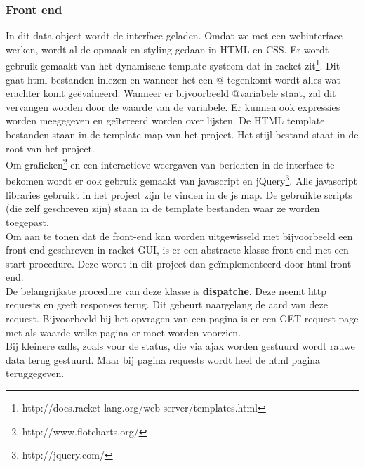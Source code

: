 \documentclass{article}
\begin{document}

\subsubsection{Front end}
\label{ssub:front-end}
In dit data object wordt de interface geladen. Omdat we met een webinterface werken, wordt al de opmaak en styling gedaan in HTML en CSS. Er wordt gebruik gemaakt van het dynamische template systeem dat in racket zit\footnote{http://docs.racket-lang.org/web-server/templates.html}. Dit gaat html bestanden inlezen en wanneer het een @ tegenkomt wordt alles wat erachter komt ge\"evalueerd. Wanneer er bijvoorbeeld @variabele staat, zal dit vervangen worden door de waarde van de variabele. Er kunnen ook expressies worden meegegeven en ge\"itereerd worden over lijsten. De HTML template bestanden staan in de template map van het project. Het stijl bestand staat in de root van het project.\\
Om grafieken\footnote{http://www.flotcharts.org/} en een interactieve weergaven van berichten in  de interface te bekomen wordt er ook gebruik gemaakt van javascript en jQuery\footnote{http://jquery.com/}. Alle javascript libraries gebruikt in het project zijn te vinden in de js map. De gebruikte scripts (die zelf geschreven zijn) staan in de template bestanden waar ze worden toegepast.\\
Om aan te tonen dat de front-end kan worden uitgewisseld met bijvoorbeeld een front-end geschreven in racket GUI, is er een abstracte klasse front-end met een start procedure. Deze wordt in dit project dan ge\"implementeerd door html-front-end.\\
De belangrijkste procedure van deze klasse is \textbf{dispatche}. Deze neemt http requests en geeft responses terug. Dit gebeurt naargelang de aard van deze request. Bijvoorbeeld bij het opvragen van een pagina is er een GET request page met als waarde welke pagina er moet worden voorzien. \\
Bij kleinere calls, zoals voor de status, die via ajax worden gestuurd wordt rauwe data terug gestuurd. Maar bij pagina requests wordt heel de html pagina teruggegeven.\\ 
\end{document}
